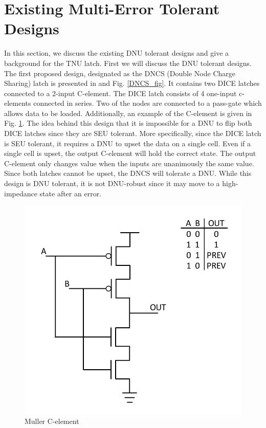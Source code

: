 \section{Existing Multi-Error Tolerant Designs} \label{sec:DNUdes}

In this section, we discuss the existing DNU tolerant designs and give a background for the TNU latch. First we will discuss the DNU tolerant designs. The first proposed design, designated as the DNCS (Double Node Charge Sharing) latch is presented in \cite{DNCS} and Fig. \ref{DNCS_fig}. It contains two DICE latches connected to a 2-input C-element. The DICE latch consists of 4 one-input c-elements connected in series. Two of the nodes are connected to a pass-gate which allows data to be loaded. Additionally, an example of the C-element is given in Fig. \ref{Cele_fig}. The idea behind this design that it is impossible for a DNU to flip both DICE latches since they are SEU tolerant. More specifically, since the DICE latch is SEU tolerant, it requires a DNU to upset the data on a single cell. Even if a single cell is upset, the output C-element will hold the correct state. The output C-element only changes value when the inputs are unanimously the same value. Since both latches cannot be upset, the DNCS will tolerate a DNU. While this design is DNU tolerant, it is not DNU-robust since it may move to a high-impedance state after an error. 

\begin{figure}[!htbp]
	\centering
	\includegraphics[width=0.55\linewidth]{Figures/C_ele}
	\caption{Muller C-element}
	\label{Cele_fig}
\end{figure}

